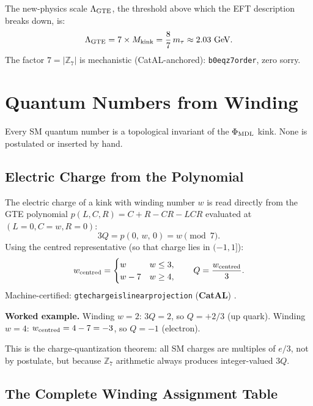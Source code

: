 \documentclass[11pt,a4paper]{article}
\newcommand{\lean}[1]{%
  \penalty-100
  \begingroup\def\_{\textunderscore\allowbreak}\texttt{#1}\endgroup}
\newcommand{\CatAL}{\textbf{CatAL}}
\newcommand{\Mkink}{M_{\rm kink}}
\begin{document}
The new-physics scale $\Lambda_{\rm GTE}$, the threshold above which the EFT
description breaks down, is:
\begin{equation}
  \Lambda_{\rm GTE} = 7 \times \Mkink = \frac{8}{7}\,m_\tau \approx 2.03~\text{GeV}.
  \label{eq:lambda_gte}
\end{equation}
The factor $7 = |\mathbb{Z}_7|$ is mechanistic (CatAL-anchored):
\lean{b0\_eq\_z7\_order}, zero sorry.

\section{Quantum Numbers from Winding}
\label{sec:qnumbers}

Every SM quantum number is a topological invariant of the $\Phi_{\rm MDL}$ kink.
None is postulated or inserted by hand.

\subsection{Electric Charge from the Polynomial}

The electric charge of a kink with winding number $w$ is read directly from the
GTE polynomial $p(L,C,R) = C + R - CR - LCR$ evaluated at $(L=0, C=w, R=0)$:
\begin{equation}
  3Q = p(0,\,w,\,0) = w \pmod{7}.
  \label{eq:charge}
\end{equation}
Using the centred representative (so that charge lies in $(-1, 1]$):
\begin{equation}
  w_{\rm centred} = \begin{cases} w & w \leq 3,\\ w - 7 & w \geq 4,\end{cases}
  \qquad Q = \frac{w_{\rm centred}}{3}.
\end{equation}
Machine-certified: \lean{gte\_charge\_is\_linear\_projection} (\CatAL)
\cite{SpivackThreeTapeCMCA}.

\textbf{Worked example.}  Winding $w = 2$: $3Q = 2$, so $Q = +2/3$ (up quark).
Winding $w = 4$: $w_{\rm centred} = 4-7 = -3$, so $Q = -1$ (electron).

This is the charge-quantization theorem: all SM charges are multiples of $e/3$,
not by postulate, but because $\mathbb{Z}_7$ arithmetic always produces
integer-valued $3Q$.

\subsection{The Complete Winding Assignment Table}
\end{document}
